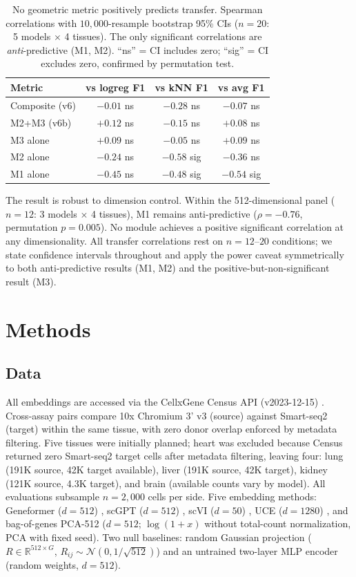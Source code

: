 \documentclass[10pt,letterpaper]{article}
\begin{document}
\begin{table}[t]
\centering
\caption{No geometric metric positively predicts transfer. Spearman correlations with $10{,}000$-resample bootstrap 95\% CIs ($n = 20$: 5 models $\times$ 4 tissues). The only significant correlations are \emph{anti}-predictive (M1, M2). ``ns'' = CI includes zero; ``sig'' = CI excludes zero, confirmed by permutation test.}
\label{tab:probes}
\small
\begin{tabular}{@{}lccc@{}}
\toprule
Metric & vs logreg F1 & vs kNN F1 & vs avg F1 \\
\midrule
Composite (v6) & $-0.01$ ns & $-0.28$ ns & $-0.07$ ns \\
M2+M3 (v6b) & $+0.12$ ns & $-0.15$ ns & $+0.08$ ns \\
M3 alone & $+0.09$ ns & $-0.05$ ns & $+0.09$ ns \\
M2 alone & $-0.24$ ns & $\mathbf{-0.58}$ sig & $-0.36$ ns \\
M1 alone & $-0.45$ ns & $\mathbf{-0.48}$ sig & $\mathbf{-0.54}$ sig \\
\bottomrule
\end{tabular}
\end{table}

The result is robust to dimension control. Within the 512-dimensional panel ($n = 12$: 3 models $\times$ 4 tissues), M1 remains anti-predictive ($\rho = -0.76$, permutation $p = 0.005$). No module achieves a positive significant correlation at any dimensionality. All transfer correlations rest on $n = 12$--$20$ conditions; we state confidence intervals throughout and apply the power caveat symmetrically to both anti-predictive results (M1, M2) and the positive-but-non-significant result (M3).


\section{Methods}

\subsection{Data}

All embeddings are accessed via the CellxGene Census API (v2023-12-15) \citep{abdulla2025cellxgene}. Cross-assay pairs compare 10x Chromium 3' v3 (source) against Smart-seq2 (target) within the same tissue, with zero donor overlap enforced by metadata filtering. Five tissues were initially planned; heart was excluded because Census returned zero Smart-seq2 target cells after metadata filtering, leaving four: lung (191K source, 42K target available), liver (191K source, 42K target), kidney (121K source, 4.3K target), and brain (available counts vary by model). All evaluations subsample $n = 2{,}000$ cells per side. Five embedding methods: Geneformer ($d = 512$) \citep{theodoris2023geneformer}, scGPT ($d = 512$) \citep{cui2024scgpt}, scVI ($d = 50$) \citep{lopez2018scvi}, UCE ($d = 1280$) \citep{rosen2026uce}, and bag-of-genes PCA-512 ($d = 512$; $\log(1 + x)$ without total-count normalization, PCA with fixed seed). Two null baselines: random Gaussian projection ($R \in \mathbb{R}^{512 \times G}$, $R_{ij} \sim \mathcal{N}(0, 1/\sqrt{512})$) and an untrained two-layer MLP encoder (random weights, $d = 512$).
\end{document}
